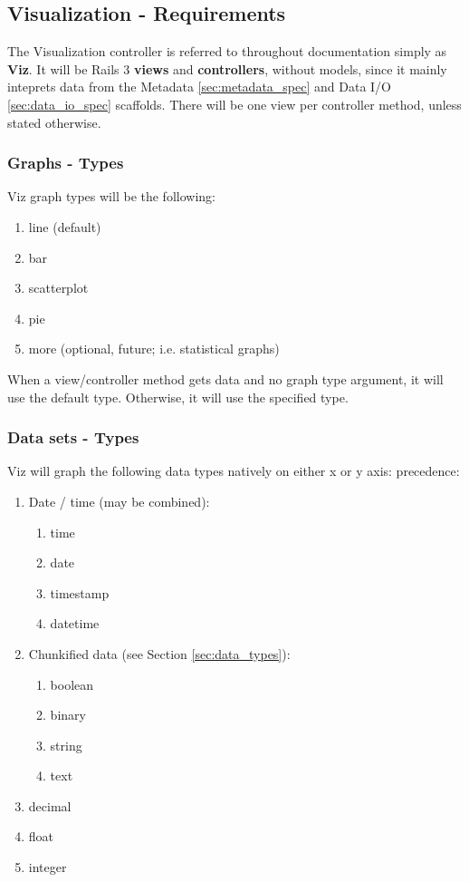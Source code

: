 \subsection{Visualization - Requirements}
\label{sec:viz_spec}
The Visualization controller is referred to throughout documentation simply as
\textbf{Viz}. It will be Rails 3 \textbf{views} and \textbf{controllers},
without models, since it mainly inteprets data from the Metadata
\ref{sec:metadata_spec} and Data I/O \ref{sec:data_io_spec} scaffolds. There 
will be one view per controller method, unless stated otherwise.

\subsubsection{Graphs - Types}
Viz graph types will be the following:
\begin{enumerate}
	\item line (default)
	\item bar
	\item scatterplot
	\item pie
	\item more (optional, future; i.e. statistical graphs)
\end{enumerate}

When a view/controller method gets data and no graph type argument, it will use
the default type. Otherwise, it will use the specified type.

\subsubsection{Data sets - Types}
Viz will graph the following data types natively on either x or y axis:
precedence:
\begin{enumerate}
	\item Date / time (may be combined):
	\begin{enumerate}
		\item time
		\item date
		\item timestamp
		\item datetime
	\end{enumerate}
	\item Chunkified data (see Section \ref{sec:data_types}):
	\begin{enumerate}
		\item boolean
		\item binary
		\item string
		\item text
	\end{enumerate}
	\item decimal
	\item float
	\item integer
\end{enumerate}

